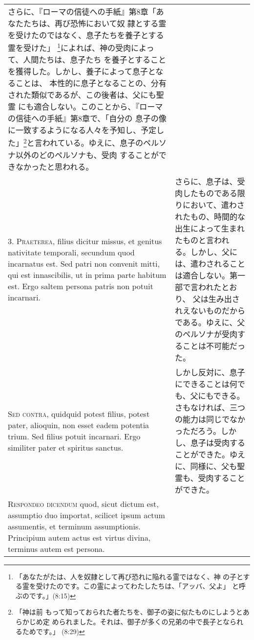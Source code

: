 \documentclass[10pt]{jsarticle} %
\begin{document}
\begin{longtable}{p{21em}p{21em}}
さらに、『ローマの信徒への手紙』第8章「あなたたちは、再び恐怖において奴
 隷とする霊を受けたのではなく、息子たちを養子とする霊を受けた」
 \footnote{「あなたがたは、人を奴隷として再び恐れに陥れる霊ではなく、神
 の子とする霊を受けたのです。この霊によってわたしたちは、「アッバ、父よ」
 と呼ぶのです。」(8:15)}によれば、神の受肉によって、人間たちは、息子たち
 を養子とすることを獲得した。しかし、養子によって息子となることは、
 本性的に息子となることの、分有された類似であるが、この後者は、父にも聖霊
 にも適合しない。このことから、『ローマの信徒への手紙』第8章で、「自分の
 息子の像に一致するようになる人々を予知し、予定した」\footnote{「神は前
 もって知っておられた者たちを、御子の姿に似たものにしようとあらかじめ定
 められました。それは、御子が多くの兄弟の中で長子となられるためです。」
 (8:29)}と言われている。ゆえに、息子のペルソナ以外のどのペルソナも、受肉
 することができなかったと思われる。


\\



3. {\scshape Praeterea}, filius dicitur missus, et genitus nativitate temporali,
secundum quod incarnatus est. Sed patri non convenit mitti, qui est
innascibilis, ut in prima parte habitum est. Ergo saltem persona patris
non potuit incarnari.


&

さらに、息子は、受肉したものである限りにおいて、遣わされたもの、時間的な出生によって生まれたものと言われ
 る。しかし、父には、遣わされることは適合しない。第一部で言われたとおり、
 父は生み出されえないものだからである。ゆえに、父のペルソナが受肉す
 ることは不可能だった。

\\



{\scshape Sed contra}, quidquid potest filius, potest pater, alioquin, non esset
eadem potentia trium. Sed filius potuit incarnari. Ergo similiter pater
et spiritus sanctus.


&

しかし反対に、息子にできることは何でも、父にもできる。さもなければ、三つ
 の能力は同じでなかっただろう。しかし、息子は受肉することができた。ゆえ
 に、同様に、父も聖霊も、受肉することができた。

\\



{\scshape Respondeo dicendum} quod, sicut dictum est, assumptio duo importat,
scilicet ipsum actum assumentis, et terminum assumptionis. Principium
autem actus est virtus divina, terminus autem est persona. 



\end{longtable}
\end{document}
